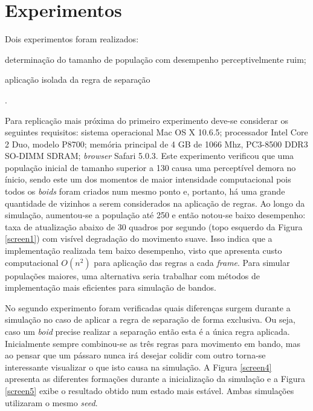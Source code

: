 \documentclass[12pt]{article}
\begin{document}
\section{Experimentos}

Dois experimentos foram realizados: \begin{inparaenum}[(1)]
\item determinação do tamanho de população com desempenho
  perceptivelmente ruim; \item aplicação isolada da regra de
  separação\end{inparaenum}.

Para replicação mais próxima do primeiro experimento deve-se
considerar os seguintes requisitos: sistema operacional Mac OS X
10.6.5; processador Intel Core 2 Duo, modelo P8700; memória principal
de 4 GB de 1066 Mhz, PC3-8500 DDR3 SO-DIMM SDRAM; \textit{browser}
Safari 5.0.3. Este experimento verificou que uma
população inicial de tamanho superior a 130 causa uma perceptível
demora no ínicio, sendo este um dos momentos de maior intensidade
computacional pois todos os \textit{boids} foram
criados num mesmo ponto e, portanto, há uma grande quantidade de vizinhos
a serem considerados na aplicação de regras. Ao longo da simulação,
aumentou-se a população até 250 e então notou-se baixo desempenho:
taxa de atualização abaixo de 30 quadros por segundo (topo esquerdo da
Figura \ref{screen1}) com visível degradação do movimento suave. Isso
indica que a implementação realizada tem baixo desempenho, visto que
apresenta custo computacional $O(n^2)$
para aplicação das regras a cada \textit{frame}. Para simular
populações maiores, uma alternativa seria trabalhar com métodos de
implementação mais eficientes \cite{maisefici1}\cite{maisefici2} para
simulação de bandos.

No segundo experimento foram verificadas quais diferenças surgem durante a
simulação no caso de aplicar a regra de separação de forma
exclusiva. Ou seja, caso um \textit{boid} precise realizar a separação
então esta é a única regra aplicada. Inicialmente sempre combinou-se
as três regras para movimento em bando, mas ao pensar que um pássaro
nunca irá desejar colidir com outro torna-se interessante
visualizar o que isto causa na simulação. A Figura \ref{screen4}
apresenta as diferentes formações durante a inicialização da simulação
e a Figura \ref{screen5} exibe o resultado obtido num estado mais
estável. Ambas simulações utilizaram o mesmo \textit{seed}.
\end{document}
